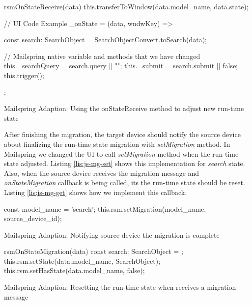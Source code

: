 \FloatBarrier
\begin{code}
\begin{js2}

rsmOnStateReceive(data) {
    this.transferToWindow(data.model_name, data.state);
}

// UI Code Example
_onState = (data, wndwKey) => {
    const search: SearchObject = SearchObjectConvert.toSearch(data);
    
    // Mailspring native variable and methods that we have changed
    this._searchQuery = search.query || "";
    this._submit = search.submit || false;
    this.trigger();
};
\end{js2}
\caption{Mailspring Adaption: Using the onStateReceive method to adjust new run-time state}
\label{lis:js-receive}
\end{code}
\FloatBarrier

After finishing the migration, the target device should notify the source device about finalizing the run-time state migration with \textit{setMigration} method. In Mailspring we changed the UI to call \textit{setMigration} method when the run-time state adjusted. Listing \ref{lis:js-mg-set} shows this implementation for \textit{search} state.
Also, when the source device receives the migration message and \textit{onStateMigration} callback is being called, its the run-time state should be reset. Listing \ref{lis:js-mg-get} shows how we implement this callback. 

\FloatBarrier
\begin{code}
\begin{js2}
const model_name = 'search';
this.rsm.setMigration(model_name, source_device_id);
\end{js2}
\caption{Mailspring Adaption: Notifying source device the migration is complete}
\label{lis:js-mg-set}
\end{code}
\FloatBarrier

\FloatBarrier
\begin{code}
\begin{js2}
rsmOnStateMigration(data) {
    const search: SearchObject = {};
    this.rsm.setState(data.model_name, SearchObject);
    this.rsm.setHasState(data.model_name, false);
}
\end{js2}
\caption{Mailspring Adaption: Resetting the run-time state when receives a migration message}
\label{lis:js-mg-get}
\end{code}
\FloatBarrier
